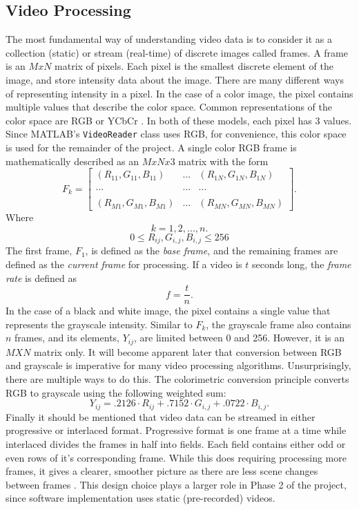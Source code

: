 \documentclass[12pt]{article} %
\begin{document}
\subsection{Video Processing}
\label{sec:vp}
The most fundamental way of understanding video data is to consider it as a collection (static) or stream (real-time) of discrete images called frames. A frame is an $MxN$ matrix of pixels. Each pixel is the smallest discrete element of the image, and store intensity data about the image. There are many different ways of representing intensity in a pixel. In the case of a color image, the pixel contains multiple values that describe the color space. Common representations of the color space are RGB or YCbCr \cite{1}. In both of these models, each pixel has 3 values.  Since MATLAB's \texttt{VideoReader} class uses RGB, for convenience, this color space is used for the remainder of the project. A single color RGB frame is mathematically described as an $MxNx3$ matrix with the form
\begin{equation}
F_k = 
\begin{bmatrix}
(R_{11}, G_{11}, B_{11}) & ... & (R_{1N}, G_{1N}, B_{1N}) \\
 & &\\
... & ... & ... \\
 & &\\
(R_{M1}, G_{M1}, B_{M1}) & ... & (R_{MN}, G_{MN}, B_{MN}) 
\end{bmatrix}
.
\end{equation}
Where
\[
k = 1, 2, ... , n.
\]
\[
0 \leq R_{ij}, G_{i,j}, B_{i,j} \leq 256
\]
The first frame, $F_1$, is defined as the \textit{base frame}, and the remaining frames are defined as the \textit{current frame} for processing. If a video is $t$ seconds long, the \textit{frame rate }is defined as
\begin{equation}
f = \frac{t}{n}.
\label{eq:framerate}
\end{equation}
In the case of a black and white image, the pixel contains a single value that represents the grayscale intensity. Similar to $F_k$, the grayscale frame also contains $n$ frames, and its elements, $Y_{ij}$, are limited between 0 and 256. However, it is an $MXN$ matrix only. It will become apparent later that conversion between RGB and grayscale is imperative for many video processing algorithms. Unsurprisingly, there are multiple ways to do this. The colorimetric conversion principle converts RGB to grayscale using the following weighted sum:
\begin{equation}
Y_{ij} = .2126 \cdot R_{ij} + .7152 \cdot G_{i,j} + .0722 \cdot B_{i,j}.
\end{equation}
Finally it should be mentioned that video data can be streamed in either progressive or interlaced format. Progressive format is one frame at a time while interlaced divides the frames in half into fields. Each field contains either odd or even rows of it's corresponding frame. While this does requiring processing more frames, it gives a clearer, smoother picture as there are less scene changes between frames \cite{1}. This design choice plays a larger role in Phase 2 of the project, since software implementation uses static (pre-recorded) videos.
\end{document}
